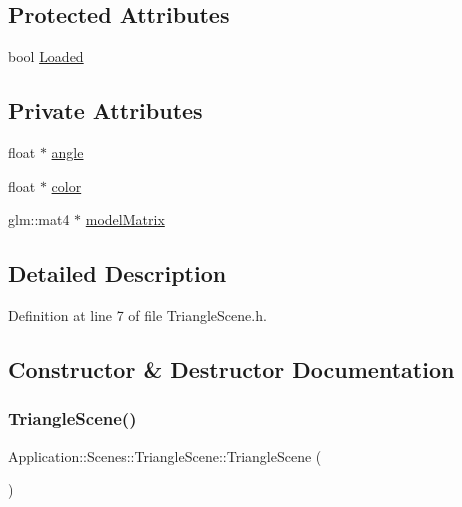 \subsection*{Protected Attributes}
\begin{DoxyCompactItemize}
\item 
bool \mbox{\hyperlink{classEngine_1_1Components_1_1Scene_ae828757eea5410550f6674421051a783}{Loaded}}
\end{DoxyCompactItemize}
\subsection*{Private Attributes}
\begin{DoxyCompactItemize}
\item 
float $\ast$ \mbox{\hyperlink{classApplication_1_1Scenes_1_1TriangleScene_a398daba41c0317ccb019d714bec0c795}{angle}}
\item 
float $\ast$ \mbox{\hyperlink{classApplication_1_1Scenes_1_1TriangleScene_ab5d8bb91e423f50a7c54979853cfcbc9}{color}}
\item 
glm\+::mat4 $\ast$ \mbox{\hyperlink{classApplication_1_1Scenes_1_1TriangleScene_a2c270015fd60f4aeb281474ddfdcd692}{model\+Matrix}}
\end{DoxyCompactItemize}


\subsection{Detailed Description}


Definition at line 7 of file Triangle\+Scene.\+h.



\subsection{Constructor \& Destructor Documentation}
\mbox{\label{classApplication_1_1Scenes_1_1TriangleScene_a36015fc65ca3005d57f23a1e2f34f016}} 
\subsubsection{\texorpdfstring{Triangle\+Scene()}{TriangleScene()}}
{\footnotesize\ttfamily Application\+::\+Scenes\+::\+Triangle\+Scene\+::\+Triangle\+Scene (\begin{DoxyParamCaption}{ }\end{DoxyParamCaption})}



